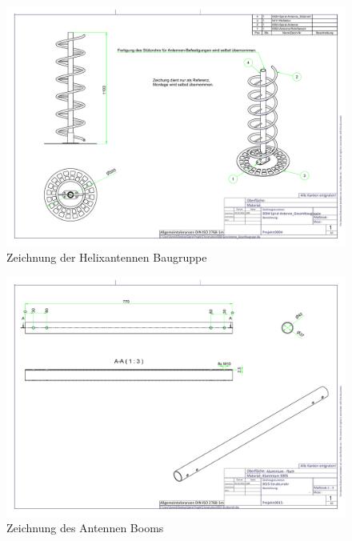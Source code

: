 \begin{figure}[h!]
	\includegraphics[angle=90,width=\textwidth]{../ref/0004-Spiral-Antenne_Gesamtbaugruppe.pdf}
	\caption{Zeichnung der Helixantennen Baugruppe}
	\label{fig:Zeichnung der Helixantenne}
\end{figure}

\begin{figure}[h!]
	\includegraphics[angle=90,width=\textwidth]{../ref/0015-Strukturrohr.pdf}
	\caption{Zeichnung des Antennen Booms}
	\label{fig:Zeichnung-Antennenboom}
\end{figure}

